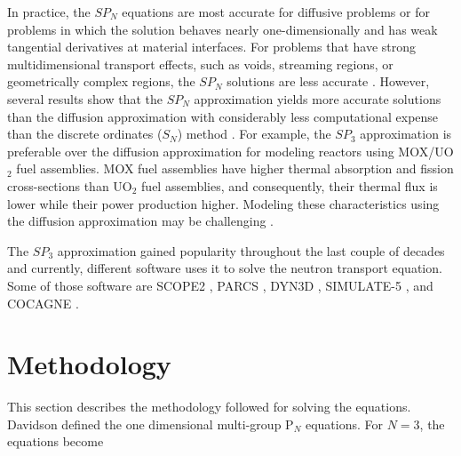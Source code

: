 \documentclass{anstrans}
\begin{document}
In practice, the $SP_N$ equations are most accurate for diffusive problems or for problems in which the solution behaves nearly one-dimensionally and has weak tangential derivatives at material interfaces.
For problems that have strong multidimensional transport effects, such as voids, streaming regions, or geometrically complex regions, the $SP_N$ solutions are less accurate \cite{downar_parcs_2004}.
However, several results show that the $SP_N$ approximation yields more accurate solutions than the diffusion approximation \cite{mui_modified_1987} \cite{beckert_development_2007} \cite{fliscounakis_potential_2012} \cite{ryu_finite_2013} \cite{khosravi_mirzaee_reactor_2019} with considerably less computational expense than the discrete ordinates ($S_N$) method \cite{brantley_simplifiedP3_2000}.
For example, the $SP_3$ approximation is preferable over the diffusion approximation for modeling reactors using MOX/UO$_2$ fuel assemblies.
MOX fuel assemblies have higher thermal absorption and fission cross-sections than UO$_2$ fuel assemblies, and consequently, their thermal flux is lower while their power production higher.
Modeling these characteristics using the diffusion approximation may be challenging \cite{brantley_simplifiedP3_2000} \cite{capilla_applications_2009}.

The $SP_3$ approximation gained popularity throughout the last couple of decades and currently, different software uses it to solve the neutron transport equation. Some of those software are SCOPE2 \cite{tatsumi_object-oriented_2002}, PARCS \cite{downar_parcs_2004}, DYN3D \cite{beckert_development_2007}, SIMULATE-5 \cite{bahadir_studsviks_2009}, and COCAGNE \cite{fliscounakis_potential_2012}.


\section{Methodology}

This section describes the methodology followed for solving the equations.
Davidson \cite{davidson_neutron_1957} defined the one dimensional multi-group P$_N$ equations.
For $N=3$, the equations become
\end{document}
